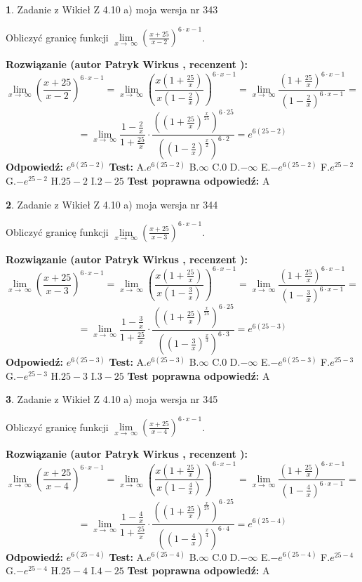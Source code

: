 \documentclass[12pt, a4paper]{article}
\theoremstyle{definition} %
\newtheorem{zad}{}
\newcommand{\zadStart}[1]{\begin{zad}#1\newline}
\newcommand{\zadStop}{\end{zad}}
\newcommand{\rozwStart}[2]{\noindent \textbf{Rozwiązanie (autor #1 , recenzent #2): }\newline}
\newcommand{\rozwStop}{\newline}
\newcommand{\odpStart}{\noindent \textbf{Odpowiedź:}\newline}
\newcommand{\odpStop}{\newline}
\newcommand{\testStart}{\noindent \textbf{Test:}\newline}
\newcommand{\testStop}{\newline}
\newcommand{\kluczStart}{\noindent \textbf{Test poprawna odpowiedź:}\newline}
\newcommand{\kluczStop}{\newline}
\begin{document}
\zadStart{Zadanie z Wikieł Z 4.10 a) moja wersja nr 343}


Obliczyć granicę funkcji  $\lim\limits_{x\to\ \infty}(\frac{x+25}{x-2})^{6\cdot x-1}$.
\zadStop
\rozwStart{Patryk Wirkus}{}
$$\lim\limits_{x\to\ \infty}(\frac{x+25}{x-2})^{6\cdot x-1} = \lim\limits_{x\to\ \infty}(\frac{x(1+\frac{25}{x})}{x(1-\frac{2}{x})})^{6\cdot x-1}=\lim\limits_{x\to\ \infty}\frac{(1+\frac{25}{x})^{6\cdot x-1}}{(1-\frac{2}{x})^{6\cdot x-1}}=$$
$$=\lim\limits_{x\to\ \infty}\frac{1-\frac{2}{x}}{1+\frac{25}{x}}\cdot\frac{((1+\frac{25}{x})^{\frac{x}{25}})^{6\cdot25}}{((1-\frac{2}{x})^{\frac{x}{2}})^{6\cdot2}}=e^{6(25-2)}$$
\rozwStop
\odpStart
$e^{6(25-2)}$
\odpStop
\testStart
A.$e^{6(25-2)}$ B.$\infty$ C.$0$ D.$-\infty$ E.$-e^{6(25-2)}$
F.$e^{25-2}$ G.$-e^{25-2}$
H.$25-2$
I.$2-25$
\testStop
\kluczStart
A
\kluczStop



\zadStart{Zadanie z Wikieł Z 4.10 a) moja wersja nr 344}


Obliczyć granicę funkcji  $\lim\limits_{x\to\ \infty}(\frac{x+25}{x-3})^{6\cdot x-1}$.
\zadStop
\rozwStart{Patryk Wirkus}{}
$$\lim\limits_{x\to\ \infty}(\frac{x+25}{x-3})^{6\cdot x-1} = \lim\limits_{x\to\ \infty}(\frac{x(1+\frac{25}{x})}{x(1-\frac{3}{x})})^{6\cdot x-1}=\lim\limits_{x\to\ \infty}\frac{(1+\frac{25}{x})^{6\cdot x-1}}{(1-\frac{3}{x})^{6\cdot x-1}}=$$
$$=\lim\limits_{x\to\ \infty}\frac{1-\frac{3}{x}}{1+\frac{25}{x}}\cdot\frac{((1+\frac{25}{x})^{\frac{x}{25}})^{6\cdot25}}{((1-\frac{3}{x})^{\frac{x}{3}})^{6\cdot3}}=e^{6(25-3)}$$
\rozwStop
\odpStart
$e^{6(25-3)}$
\odpStop
\testStart
A.$e^{6(25-3)}$ B.$\infty$ C.$0$ D.$-\infty$ E.$-e^{6(25-3)}$
F.$e^{25-3}$ G.$-e^{25-3}$
H.$25-3$
I.$3-25$
\testStop
\kluczStart
A
\kluczStop



\zadStart{Zadanie z Wikieł Z 4.10 a) moja wersja nr 345}


Obliczyć granicę funkcji  $\lim\limits_{x\to\ \infty}(\frac{x+25}{x-4})^{6\cdot x-1}$.
\zadStop
\rozwStart{Patryk Wirkus}{}
$$\lim\limits_{x\to\ \infty}(\frac{x+25}{x-4})^{6\cdot x-1} = \lim\limits_{x\to\ \infty}(\frac{x(1+\frac{25}{x})}{x(1-\frac{4}{x})})^{6\cdot x-1}=\lim\limits_{x\to\ \infty}\frac{(1+\frac{25}{x})^{6\cdot x-1}}{(1-\frac{4}{x})^{6\cdot x-1}}=$$
$$=\lim\limits_{x\to\ \infty}\frac{1-\frac{4}{x}}{1+\frac{25}{x}}\cdot\frac{((1+\frac{25}{x})^{\frac{x}{25}})^{6\cdot25}}{((1-\frac{4}{x})^{\frac{x}{4}})^{6\cdot4}}=e^{6(25-4)}$$
\rozwStop
\odpStart
$e^{6(25-4)}$
\odpStop
\testStart
A.$e^{6(25-4)}$ B.$\infty$ C.$0$ D.$-\infty$ E.$-e^{6(25-4)}$
F.$e^{25-4}$ G.$-e^{25-4}$
H.$25-4$
I.$4-25$
\testStop
\kluczStart
A
\kluczStop
\end{document}
